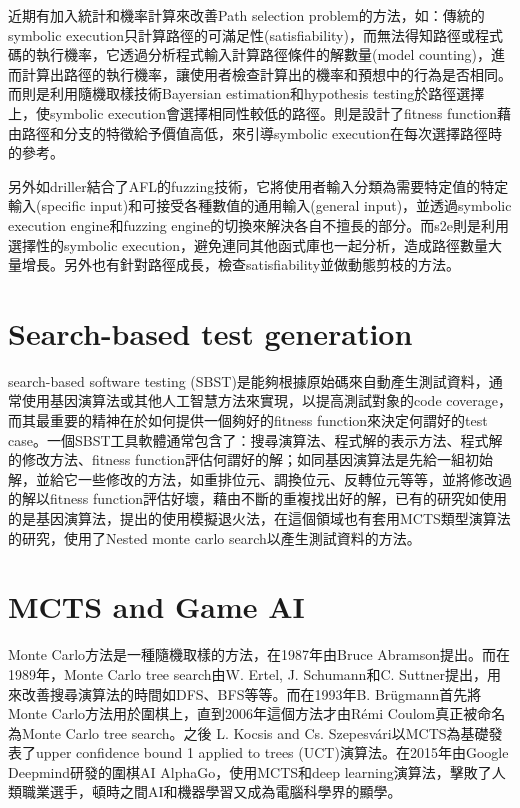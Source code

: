 \documentclass[12pt,a4paper,oneside]{book}
\begin{document}
近期有加入統計和機率計算來改善Path selection problem的方法，如\cite{probabilistic}：傳統的symbolic execution只計算路徑的可滿足性(satisfiability)，而無法得知路徑或程式碼的執行機率，它透過分析程式輸入計算路徑條件的解數量(model counting)，進而計算出路徑的執行機率，讓使用者檢查計算出的機率和預想中的行為是否相同。而\cite{StatisticalSymbolicExecution}則是利用隨機取樣技術Bayersian estimation和hypothesis testing於路徑選擇上，使symbolic execution會選擇相同性較低的路徑。\cite{FitnessGuided}則是設計了fitness function藉由路徑和分支的特徵給予價值高低，來引導symbolic execution在每次選擇路徑時的參考。

另外如driller\cite{stephens2016driller}結合了AFL\cite{AFL}的fuzzing技術，它將使用者輸入分類為需要特定值的特定輸入(specific input)和可接受各種數值的通用輸入(general input)，並透過symbolic execution engine和fuzzing engine的切換來解決各自不擅長的部分。而s2e\cite{chipounov2012s2e}則是利用選擇性的symbolic execution，避免連同其他函式庫也一起分析，造成路徑數量大量增長。另外也有針對路徑成長，檢查satisfiability並做動態剪枝的方法\cite{PathPruning}。

\section{Search-based test generation}

search-based software testing (SBST)是能夠根據原始碼來自動產生測試資料，通常使用基因演算法或其他人工智慧方法來實現，以提高測試對象的code coverage，而其最重要的精神在於如何提供一個夠好的fitness function來決定何謂好的test case。一個SBST工具軟體通常包含了：搜尋演算法、程式解的表示方法、程式解的修改方法、fitness function評估何謂好的解；如同基因演算法是先給一組初始解，並給它一些修改的方法，如重排位元、調換位元、反轉位元等等，並將修改過的解以fitness function評估好壞，藉由不斷的重複找出好的解，已有的研究如\cite{GA2ST}使用的是基因演算法，\cite{simulated}提出的使用模擬退火法，在這個領域也有套用MCTS類型演算法的研究，使用了Nested monte carlo search以產生測試資料的方法\cite{feldt2015broadening}\cite{poulding2014generating}。

\section{MCTS and Game AI}

Monte Carlo方法是一種隨機取樣的方法，在1987年由Bruce Abramson提出\cite{mcmethod}。而在1989年，Monte Carlo tree search由W. Ertel, J. Schumann和C. Suttner提出，用來改善搜尋演算法的時間如DFS、BFS等等。而在1993年B. Brügmann首先將Monte Carlo方法用於圍棋上\cite{mc_go}，直到2006年這個方法才由Rémi Coulom真正被命名為Monte Carlo tree search\cite{MCTS_naming}。之後 L. Kocsis and Cs. Szepesvári以MCTS為基礎發表了upper confidence bound 1 applied to trees (UCT)演算法\cite {UCT}。在2015年由Google Deepmind研發的圍棋AI AlphaGo\cite{alphago}，使用MCTS和deep learning演算法，擊敗了人類職業選手，頓時之間AI和機器學習又成為電腦科學界的顯學。
\end{document}
